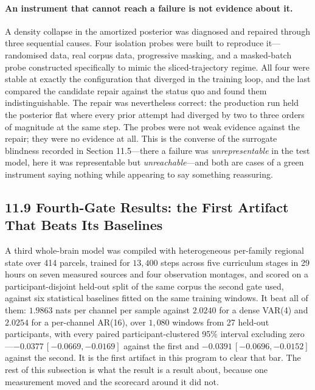 \paragraph{An instrument that cannot reach a failure is not evidence about it.}
A density collapse in the amortized posterior was diagnosed and repaired
through three sequential causes. Four isolation probes were built to reproduce
it---randomised data, real corpus data, progressive masking, and a
masked-batch probe constructed specifically to mimic the sliced-trajectory
regime. All four were stable at exactly the configuration that diverged in the
training loop, and the last compared the candidate repair against the status
quo and found them indistinguishable. The repair was nevertheless correct: the
production run held the posterior flat where every prior attempt had diverged
by two to three orders of magnitude at the same step. The probes were not weak
evidence against the repair; they were no evidence at all. This is the
converse of the surrogate blindness recorded in Section 11.5---there a failure
was \emph{unrepresentable} in the test model, here it was representable but
\emph{unreachable}---and both are cases of a green instrument saying nothing
while appearing to say something reassuring.

\subsection{11.9 Fourth-Gate Results: the First Artifact That Beats Its
Baselines}

A third whole-brain model was compiled with heterogeneous per-family regional
state over 414 parcels, trained for \(13{,}400\) steps across five curriculum
stages in 29 hours on seven measured sources and four observation montages, and
scored on a participant-disjoint held-out split of the same corpus the second
gate used, against six statistical baselines fitted on the same training windows.
It beat all of them: \(1.9863\) nats per channel per sample
against \(2.0240\) for a dense VAR(4) and \(2.0254\) for a per-channel AR(16),
over \(1{,}080\) windows from 27 held-out participants, with every paired
participant-clustered 95\% interval excluding zero---\(-0.0377\,[-0.0669,
-0.0169]\) against the first and \(-0.0391\,[-0.0696, -0.0152]\) against the
second. It is the first artifact in this program to clear that bar. The rest of
this subsection is what the result is a result about, because one measurement
moved and the scorecard around it did not.

